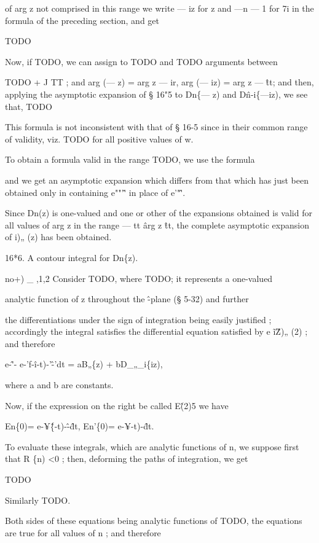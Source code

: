 of arg z not comprised in this range we write — iz for z and —n — 1 for 7i in 
the formula of the preceding section, and get 

TODO

Now, if TODO, we can assign to TODO and TODO arguments between 

TODO 
+ J TT ; and arg (— z) = arg z — ir, arg (— iz) = arg z — \^tt; and then, applying 
the asymptotic expansion of § 16"5 to Dn\{— z) and D\^n-i\{—iz), we see that, 
TODO

%
%

This formula is not inconsistent with that of § 16-5 since in their common range of 
validity, viz. TODO for all positive values of w. 

To obtain a formula valid in the range TODO, we use the 
formula 

and we get an asymptotic expansion which differs from that which has just 
been obtained only in containing e""'\^' in place of e'"\^'. 

Since Dn(z) is one-valued and one or other of the expansions obtained 
is valid for all values of arg z in the range — tt \^ arg z \^tt, the complete 
asymptotic expansion of i)„ (z) has been obtained. 

16*6. A contour integral for Dn\{z). 

no+) \_ ,1,2 
Consider TODO, where TODO; it represents a one-valued 

analytic function of z throughout the \^-plane (§ 5-32) and further 

the differentiations under the sign of integration being easily justified ; accordingly the 
integral satisfies the differential equation satisfied by e \~ i\^ Z)„ (2) ; and therefore 

e-\^'- e-'f-\^i-t)-'\^-'dt = aB„\{z) + bD\_„\_i\{iz), 

where a and b are constants. 

Now, if the expression on the right be called E\^ (2)5 we have 

En\{0)= e-¥\^\{-t)-\^-\^dt, En'\{0)= e-¥-t)-\^dt. 

To evaluate these integrals, which are analytic functions of n, we suppose first that 
R \{n) <0 ; then, deforming the paths of integration, we get 

TODO

Similarly TODO.

Both sides of these equations being analytic functions of TODO, the equations are true for 
all values of n ; and therefore 

